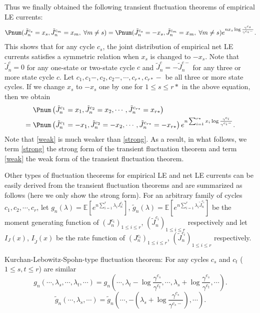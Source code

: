 Thus we finally obtained the following transient fluctuation theorems of empirical LE currents:
\begin{equation}\label{strong}
\Pnum(\tilde{J}^{c_s}_n=x_s,\tilde{J}^{c_m}_n=x_m,\;\forall m\neq s) \\
= \Pnum(\tilde{J}^{c_s}_n=-x_s,\tilde{J}^{c_m}_n=x_m,\;\forall m\neq s)e^{nx_s\log\frac{\gamma^{c_s}}{\gamma^{c_s-}}}.
\end{equation}
This shows that for any cycle $c_s$, the joint distribution of empirical net LE currents satisfies a symmetric relation when $x_s$ is changed to $-x_s$. Note that $\tilde{J}^c_n=0$ for any one-state or two-state cycle $c$ and $\tilde{J}^c_n=-\tilde{J}^{c-}_n$ for any three or more state cycle $c$. Let $c_1,c_1-,c_2,c_2-,\cdots,c_{r*},c_{r*}-$ be all three or more state cycles. If we change $x_s$ to $-x_s$ one by one for $1\leq s\leq r*$ in the above equation, then we obtain
\begin{equation}\label{weak}
\begin{split}
&\;\Pnum\left(\tilde{J}^{c_1}_n=x_1,\tilde{J}^{c_2}_n=x_2,\cdots,\tilde{J}^{c_{r*}}_n=x_{r*}\right)\\
=&\; \Pnum\left(\tilde{J}^{c_1}_n=-x_1,\tilde{J}^{c_2}_n=-x_2,\cdots,\tilde{J}^{c_{r*}}_n=-x_{r*}\right)
e^{n\sum_{i=1}^{r*}x_i\log\frac{\gamma^{c_i}}{\gamma^{c_i-}}}.
\end{split}
\end{equation}
Note that \eqref{weak} is much weaker than \eqref{strong}. As a result, in what follows, we term \eqref{strong} the strong form of the transient fluctuation theorem and term \eqref{weak} the weak form of the transient fluctuation theorem.

Other types of fluctuation theorems for empirical LE and net LE currents can be easily derived from the transient fluctuation theorems and are summarized as follows (here we only show the strong form). For an arbitrary family of cycles $c_1,c_2,\cdots,c_r$, let $g_n(\lambda) = \mathbb{E}[e^{n\sum_{i=1}^r\lambda_iJ^{c_i}_n}]$, $\tilde{g}_n(\lambda) = \mathbb{E}[e^{n\sum_{i=1}^{r}\lambda_i\tilde{J}^{c_i}_n}]$ be the moment generating function of $(J^{c_i}_n)_{1\le i\le r}$, $(\tilde{J}^{c_i}_n)_{1\le i\le r}$ respectively and let $I_{J}(x)$, $I_{\tilde{J}}(x)$ be the rate function of $(J^{c_i}_n)_{1\le i\le r}$, $(\tilde{J}^{c_i}_n)_{1\le i\le r}$ respectively.

Kurchan-Lebowitz-Spohn-type fluctuation theorem: For any cycles $c_s$ and $c_t$ ($1\le s,t\le r$) are similar
\begin{equation*}
	g_n(\cdots,\lambda_s,\cdots,\lambda_t,\cdots) = g_n\left(\cdots,\lambda_t-\log\frac{\gamma^{c_s}}{\gamma^{c_t}},\cdots,\lambda_s+\log\frac{\gamma^{c_s}}{\gamma^{c_t}},\cdots\right).
\end{equation*}
\begin{equation*}
	\tilde{g}_n(\cdots,\lambda_s,\cdots)=\tilde{g}_n\left(\cdots,-\left(\lambda_s+\log\frac{\gamma^{c_s}}{\gamma^{c_s-}}\right),\cdots\right).
\end{equation*}

